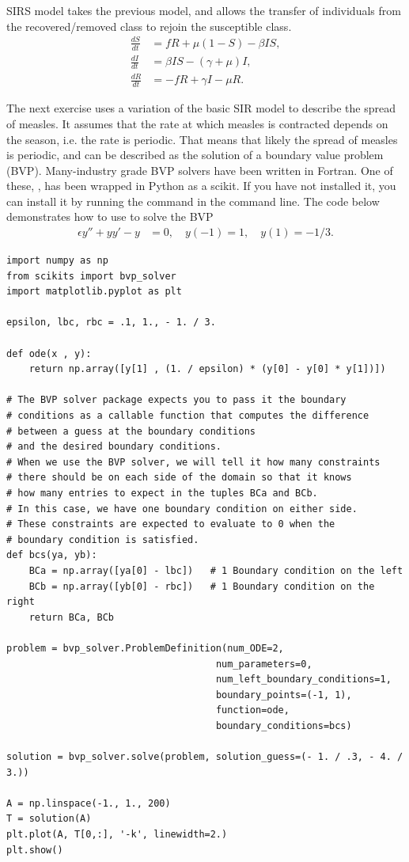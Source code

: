 SIRS model takes the previous model, and allows the transfer of individuals from the recovered/removed class to rejoin the susceptible class. 
\begin{align*}
\frac{dS}{dt} &= fR + \mu(1 -S) - \beta I S,\\
\frac{dI}{dt} &= \beta I S - (\gamma + \mu)I, \\
\frac{dR}{dt} &= -fR + \gamma I - \mu R.
\end{align*}

The next exercise uses a variation of the basic SIR model to describe the spread of measles. 
It assumes that the rate at which measles is contracted depends on the season, i.e. the rate is periodic.
That means that likely the spread of measles is periodic, and can be described as the solution of a boundary value problem (BVP).
Many-industry grade BVP solvers have been written in Fortran.
One of these, , has been wrapped in Python as a scikit.
If you have not installed it, you can install it by running the command  in the command line.
The code below demonstrates how to use  to solve the BVP
\begin{align*}
	\epsilon y'' + yy' - y &= 0, \quad y(-1) = 1, \quad y(1) = -1/3.
\end{align*}

\begin{lstlisting}
import numpy as np
from scikits import bvp_solver
import matplotlib.pyplot as plt

epsilon, lbc, rbc = .1, 1., - 1. / 3.

def ode(x , y):
    return np.array([y[1] , (1. / epsilon) * (y[0] - y[0] * y[1])]) 

# The BVP solver package expects you to pass it the boundary
# conditions as a callable function that computes the difference
# between a guess at the boundary conditions
# and the desired boundary conditions.
# When we use the BVP solver, we will tell it how many constraints
# there should be on each side of the domain so that it knows
# how many entries to expect in the tuples BCa and BCb.
# In this case, we have one boundary condition on either side.
# These constraints are expected to evaluate to 0 when the
# boundary condition is satisfied.
def bcs(ya, yb):
    BCa = np.array([ya[0] - lbc])   # 1 Boundary condition on the left
    BCb = np.array([yb[0] - rbc])   # 1 Boundary condition on the right
    return BCa, BCb

problem = bvp_solver.ProblemDefinition(num_ODE=2,
                                     num_parameters=0,
                                     num_left_boundary_conditions=1,
                                     boundary_points=(-1, 1),
                                     function=ode,
                                     boundary_conditions=bcs)

solution = bvp_solver.solve(problem, solution_guess=(- 1. / .3, - 4. / 3.))

A = np.linspace(-1., 1., 200)
T = solution(A)
plt.plot(A, T[0,:], '-k', linewidth=2.)
plt.show()
\end{lstlisting}

